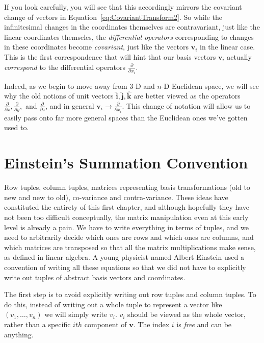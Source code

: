 	If you look carefully, you will see that this accordingly mirrors the covariant change of vectors in Equation~\eqref{eq:CovariantTransform2}. So while the infinitesimal changes in the coordinates themselves are contravariant, just like the linear coordinates themseles, the \emph{differential operators} corresponding to changes in these coordinates become \emph{covariant}, just like the vectors $\mathbf v_i$ in the linear case. This is the first correspondence that will hint that our basis vectors $\mathbf v_i$ actually \emph{correspond} to the differential operators $\frac{\partial}{\partial x_i}$.
	
	Indeed, as we begin to move away from 3-D and $n$-D Euclidean space, we will see why the old notions of unit vectors $\mathbf{\hat i}, \mathbf{\hat j}, \mathbf{\hat k}$ are better viewed as the operators $\frac{\partial}{\partial x}, \frac{\partial}{\partial y},$ and $ \frac{\partial}{\partial z}$, and in general $\mathbf v_i \rightarrow \frac{\partial}{\partial x_i}$. This change of notation will allow us to easily pass onto far more general spaces than the Euclidean ones we've gotten used to. 
	
	
	\section{Einstein's Summation Convention} %
	\label{sec:einstein's_summation_convention}
	
	Row tuples, column tuples, matrices representing basis transformations (old to new and new to old), co-variance and contra-variance. These ideas have constituted the entirety of this first chapter, and although hopefully they have not been too difficult conceptually, the matrix manipulation even at this early level is already a pain. We have to write everything in terms of tuples, and we need to arbitrarily decide which ones are rows and which ones are columns, and which matrices are transposed so that all the matrix multiplications make sense, as defined in linear algebra. A young physicist named Albert Einstein used a convention of writing all these equations so that we did not have to explicitly write out tuples of abstract basis vectors and coordinates.
	
	The first step is to avoid explicitly writing out row tuples and column tuples. To do this, instead of writing out a whole tuple to represent a vector like $(v_1, \dots, v_n)$ we will simply write $v_i$. $v_i$ should be viewed as the whole vector, rather than a specific $ith$ component of $\mathbf v$. The index $i$ is \emph{free} and can be anything. 
	
